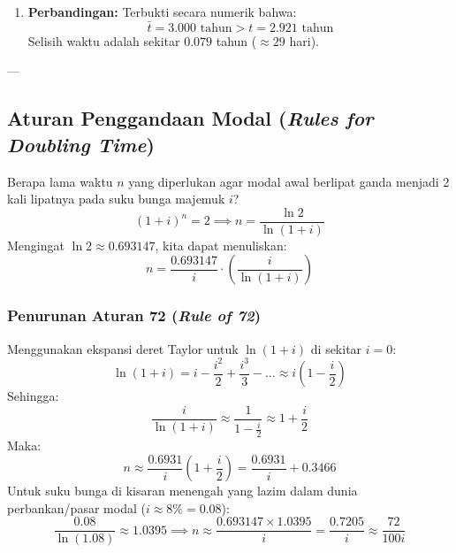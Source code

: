\documentclass[11pt,a4paper]{article}
\begin{document}
\begin{examplebox}
\begin{enumerate}[label=(\alph*)]
    \item \textbf{Perbandingan:}
    Terbukti secara numerik bahwa:
    \begin{equation*}
        \bar{t} = 3.000 \text{ tahun} > t = 2.921 \text{ tahun}
    \end{equation*}
    Selisih waktu adalah sekitar $0.079$ tahun ($\approx 29$ hari).
\end{enumerate}
\end{examplebox}

---

\subsection{Aturan Penggandaan Modal (\textit{Rules for Doubling Time})}

Berapa lama waktu $n$ yang diperlukan agar modal awal berlipat ganda menjadi 2 kali lipatnya pada suku bunga majemuk $i$?
\begin{equation*}
    (1 + i)^n = 2 \implies n = \frac{\ln 2}{\ln(1 + i)}
\end{equation*}
Mengingat $\ln 2 \approx 0.693147$, kita dapat menuliskan:
\begin{equation}
    n = \frac{0.693147}{i} \cdot \left( \frac{i}{\ln(1 + i)} \right)
\end{equation}

\subsubsection{Penurunan Aturan 72 (\textit{Rule of 72})}
Menggunakan ekspansi deret Taylor untuk $\ln(1 + i)$ di sekitar $i = 0$:
\begin{equation*}
    \ln(1 + i) = i - \frac{i^2}{2} + \frac{i^3}{3} - \dots \approx i \left(1 - \frac{i}{2}\right)
\end{equation*}
Sehingga:
\begin{equation*}
    \frac{i}{\ln(1 + i)} \approx \frac{1}{1 - \frac{i}{2}} \approx 1 + \frac{i}{2}
\end{equation*}
Maka:
\begin{equation*}
    n \approx \frac{0.6931}{i} \left(1 + \frac{i}{2}\right) = \frac{0.6931}{i} + 0.3466
\end{equation*}
Untuk suku bunga di kisaran menengah yang lazim dalam dunia perbankan/pasar modal ($i \approx 8\% = 0.08$):
\begin{equation*}
    \frac{0.08}{\ln(1.08)} \approx 1.0395 \implies n \approx \frac{0.693147 \times 1.0395}{i} = \frac{0.7205}{i} \approx \frac{72}{100i}
\end{equation*}
\end{document}
